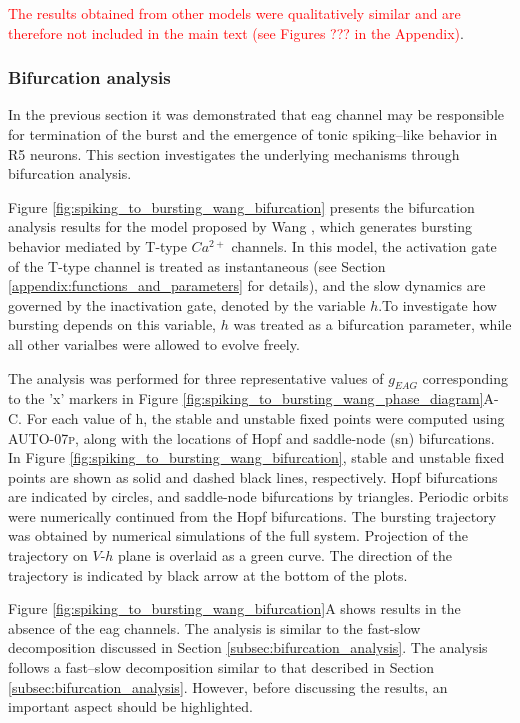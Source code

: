 \documentclass[../main.tex]{subfiles}
\begin{document}
\textcolor{red}{The results obtained from other models were qualitatively similar and are therefore not included in the main text (see Figures ??? in the Appendix)}. 

\subsubsection{Bifurcation analysis} \label{subsubsec:spiking_to_bursting_bifurcation}

In the previous section it was demonstrated that \gls{eag} channel may be responsible for termination of the burst and the emergence of tonic spiking–like behavior in R5 neurons. This section investigates the underlying mechanisms through bifurcation analysis.

Figure \ref{fig:spiking_to_bursting_wang_bifurcation} presents the bifurcation analysis results for the model proposed by Wang \parencite{wangMultipleDynamicalModes1994}, which generates bursting behavior mediated by T-type $Ca^{2+}$ channels. In this model, the activation gate of the T-type channel is treated as instantaneous (see Section \ref{appendix:functions_and_parameters} for details), and the slow dynamics are governed by the inactivation gate, denoted by the variable $h$.To investigate how bursting depends on this variable, $h$ was treated as a bifurcation parameter, while all other varialbes were allowed to evolve freely. 

The analysis was performed for three representative values of $g_{EAG}$ corresponding to the 'x' markers in Figure \ref{fig:spiking_to_bursting_wang_phase_diagram}A-C. For each value of h, the stable and unstable fixed points were computed using \textsc{AUTO-07p}, along with the locations of Hopf and saddle-node (\gls{sn}) bifurcations. In Figure \ref{fig:spiking_to_bursting_wang_bifurcation}, stable and unstable fixed points are shown as solid and dashed black lines, respectively. Hopf bifurcations are indicated by circles, and saddle-node bifurcations by triangles. Periodic orbits were numerically continued from the Hopf bifurcations. The bursting trajectory was obtained by numerical simulations of the full system. Projection of the trajectory on $V$-$h$ plane is overlaid as a green curve. The direction of the trajectory is indicated by black arrow at the bottom of the plots.

Figure \ref{fig:spiking_to_bursting_wang_bifurcation}A shows results in the absence of the \gls{eag} channels. The analysis is similar to the fast-slow decomposition discussed in Section \ref{subsec:bifurcation_analysis}. The analysis follows a fast–slow decomposition similar to that described in Section \ref{subsec:bifurcation_analysis}. However, before discussing the results, an important aspect should be highlighted.
\end{document}
